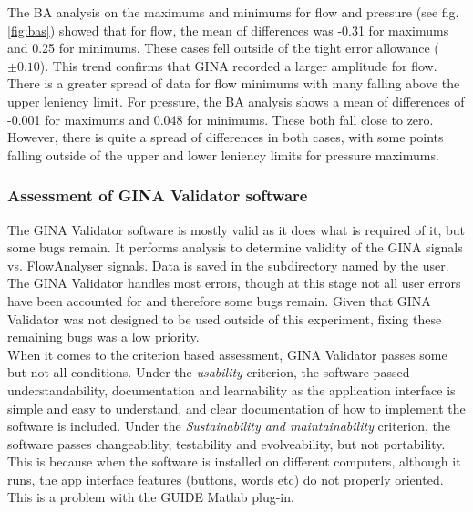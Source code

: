 \documentclass[12pt, openany, oneside]{book}
\begin{document}
The BA analysis on the maximums and minimums for flow and pressure (see fig. \ref{fig:bas}) showed that for flow, the mean of differences was -0.31 for maximums and 0.25 for minimums. These cases fell outside of the tight error allowance ($\pm0.10$). This trend confirms that GINA recorded a larger amplitude for flow. There is a greater spread of data for flow minimums with many falling above the upper leniency limit.  For pressure, the BA analysis shows a mean of differences of -0.001 for maximums and 0.048 for minimums. These both fall close to zero. However, there is quite a spread of differences in both cases, with some points falling outside of the upper and lower leniency limits for pressure maximums.

\subsubsection{Assessment of GINA Validator software}
The GINA Validator software is mostly valid as it does what is required of it, but some bugs remain. It performs analysis to determine validity of the GINA signals vs. FlowAnalyser signals.  Data is saved in the subdirectory named by the user. The GINA Validator handles most errors, though at this stage not all user errors have been accounted for and therefore some bugs remain. Given that GINA Validator was not designed to be used outside of this experiment, fixing these remaining bugs was a low priority. \\

When it comes to the criterion based assessment, GINA Validator passes some but not all conditions. Under the \textit{usability} criterion, the software passed understandability, documentation and learnability as the application interface is simple and easy to understand, and clear documentation of how to implement the software is included.  Under the \textit{Sustainability and maintainability} criterion, the software passes changeability, testability and evolveability, but not portability. This is because when the software is installed on different computers, although it runs, the app interface features (buttons, words etc) do not properly oriented. This is a problem with the GUIDE Matlab plug-in.
\end{document}
